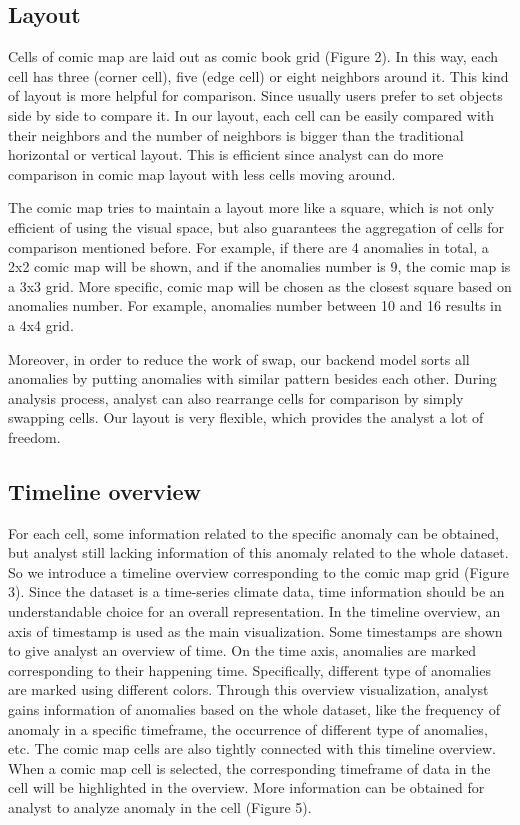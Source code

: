 \documentclass{vgtc}                          %
\begin{document}
\subsection{Layout}
Cells of comic map are laid out as comic book grid (Figure 2). In this way, each cell has three (corner cell), five (edge cell) or eight neighbors around it. This kind of layout is more helpful for comparison. Since usually users prefer to set objects side by side to compare it. In our layout, each cell can be easily compared with their neighbors and the number of neighbors is bigger than the traditional horizontal or vertical layout. This is efficient since analyst can do more comparison in comic map layout with less cells moving around.

The comic map tries to maintain a layout more like a square, which is not only efficient of using the visual space, but also guarantees the aggregation of cells for comparison mentioned before. For example, if there are 4 anomalies in total, a 2x2 comic map will be shown, and if the anomalies number is 9, the comic map is a 3x3 grid. More specific, comic map will be chosen as the closest square based on anomalies number. For example, anomalies number between 10 and 16 results in a 4x4 grid.

Moreover, in order to reduce the work of swap, our backend model sorts all anomalies by putting anomalies with similar pattern besides each other. During analysis process, analyst can also rearrange cells for comparison by simply swapping cells. Our layout is very flexible, which provides the analyst a lot of freedom.

\subsection{Timeline overview}

For each cell, some information related to the specific anomaly can be obtained, but analyst still lacking information of this anomaly related to the whole dataset. So we introduce a timeline overview corresponding to the comic map grid (Figure 3). 
Since the dataset is a time-series climate data, time information should be an understandable choice for an overall representation. In the timeline overview, an axis of timestamp is used as the main visualization. Some timestamps are shown to give analyst an overview of time. On the time axis, anomalies are marked corresponding to their happening time. Specifically, different type of anomalies are marked using different colors. Through this overview visualization, analyst gains information of anomalies based on the whole dataset, like the frequency of anomaly in a specific timeframe, the occurrence of different type of anomalies, etc. 
The comic map cells are also tightly connected with this timeline overview. When a comic map cell is selected, the corresponding timeframe of data in the cell will be highlighted in the overview. More information can be obtained for analyst to analyze anomaly in the cell (Figure 5). 
\end{document}
